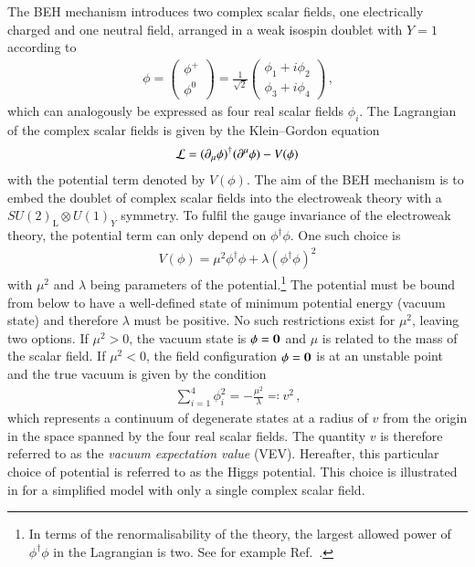 The BEH mechanism introduces two complex scalar fields, one electrically charged
and one neutral field, arranged in a weak isospin doublet with $Y = 1$ according
to
\begin{align*}
  \phi =
  \begin{pmatrix}
    \phi^+ \\
    \phi^0
  \end{pmatrix}
  = \frac{1}{\sqrt{2}}
  \begin{pmatrix}
    \phi_1 + i \phi_2 \\
    \phi_3 + i \phi_4
  \end{pmatrix} \,\text{,}
\end{align*}
which can analogously be expressed as four real scalar fields $\phi_i$. The
Lagrangian of the complex scalar fields is given by the Klein--Gordon equation
\begin{align*}
  \mathcal{L} = (\partial_\mu \phi)^\dagger (\partial^\mu \phi) - V(\phi)
\end{align*}
with the potential term denoted by $V(\phi)$. The aim of the BEH mechanism is to
embed the doublet of complex scalar fields into the electroweak theory with a
$SU(2)_{\text{L}}\otimes U(1)_Y$ symmetry. To fulfil the gauge invariance of the
electroweak theory, the potential term can only depend on $\phi^\dagger
\phi$. One such choice is
\begin{align}
  V(\phi) = \mu^2 \phi^\dagger \phi + \lambda (\phi^\dagger \phi)^2
  \label{eq:higgs_potential}
\end{align}
with $\mu^2$ and $\lambda$ being parameters of the potential.\footnote{In terms
  of the renormalisability of the theory, the largest allowed power of
  $\phi^\dagger \phi$ in the Lagrangian is two. See for example
  Ref.~\cite{Peskin:1995ev}.} The potential must be bound from below to have a
well-defined state of minimum potential energy (vacuum state) and therefore
$\lambda$ must be positive. No such restrictions exist for $\mu^2$, leaving two
options. If $\mu^2 > 0$, the vacuum state is $\phi = \bm{0}$ and $\mu$ is
related to the mass of the scalar field. If $\mu^2 < 0$, the field configuration
$\phi = \bm{0}$ is at an unstable point and the true vacuum is given by the
condition
\begin{align*}
  \sum_{i = 1}^4 \phi_i^2 = -\frac{\mu^2}{\lambda} \eqqcolon v^2 \,\text{,}
\end{align*}
which represents a continuum of degenerate states at a radius of $v$ from the
origin in the space spanned by the four real scalar fields. The quantity $v$ is
therefore referred to as the \emph{vacuum expectation value} (VEV). Hereafter,
this particular choice of potential is referred to as the Higgs potential. This
choice is illustrated in  for a simplified model with only
a single complex scalar field.

